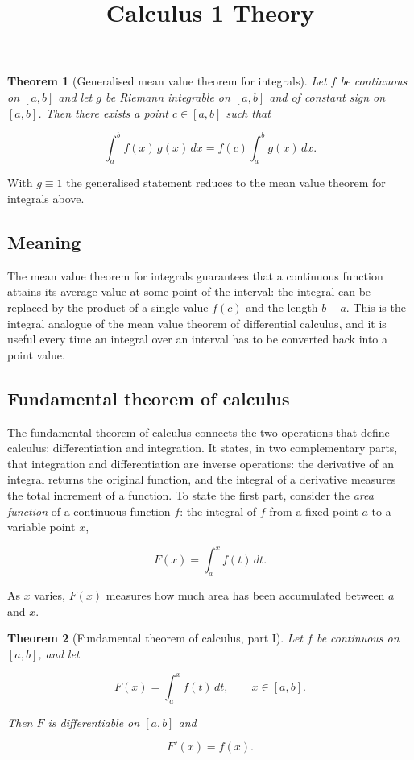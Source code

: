 \documentclass[11pt,a4paper]{article} \usepackage[T1]{fontenc}
\theoremstyle{plain} \newtheorem{theorem}{Theorem} \title{Calculus 1 Theory}
\begin{document}
\begin{theorem}
[Generalised mean value theorem for integrals] Let $f$ be continuous on $[a,b]$
and let $g$ be Riemann integrable on $[a,b]$ and of constant sign on $[a,b]$.
Then there exists a point $c\in[a,b]$ such that

\[
\int_a^b f(x)\,g(x)\,dx = f(c)\int_a^b g(x)\,dx.
\]

\end{theorem}

With $g\equiv 1$ the generalised statement reduces to the mean value theorem
for integrals above.

\subsection*{Meaning}

The mean value theorem for integrals guarantees that a continuous function
attains its average value at some point of the interval: the integral can be
replaced by the product of a single value $f(c)$ and the length $b-a$. This is
the integral analogue of the mean value theorem of differential calculus, and
it is useful every time an integral over an interval has to be converted back
into a point value.

\subsection {Fundamental theorem of calculus}

The fundamental theorem of calculus connects the two operations that define
calculus: differentiation and integration. It states, in two complementary
parts, that integration and differentiation are inverse operations: the
derivative of an integral returns the original function, and the integral of a
derivative measures the total increment of a function. To state the first part,
consider the \emph{area function} of a continuous function $f$: the integral of
$f$ from a fixed point $a$ to a variable point $x$,

\[
F(x) = \int_a^x f(t)\,dt.
\]

As $x$ varies, $F(x)$ measures how much area has been accumulated between $a$
and $x$.

\begin{theorem}
[Fundamental theorem of calculus, part I] Let $f$ be continuous on $[a,b]$, and
let

\[
F(x) = \int_a^x f(t)\,dt, \qquad x\in[a,b].
\]

Then $F$ is differentiable on $[a,b]$ and

\[
F'(x) = f(x).
\]

\end{theorem}
\end{document}
